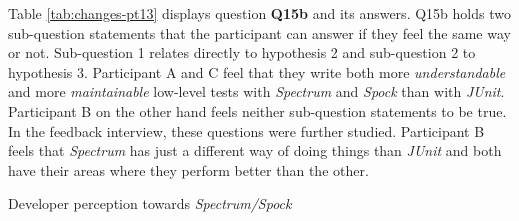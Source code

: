 Table \ref{tab:changes-pt13} displays question \textbf{Q15b} and its answers. Q15b holds two sub-question statements that the participant can answer
if they feel the same way or not. Sub-question 1 relates directly to hypothesis 2 and sub-question 2 to
hypothesis 3. Participant A and C feel that they write both more \textit{understandable} and more \textit{maintainable} low-level
tests with \textit{Spectrum} and \textit{Spock} than with \textit{JUnit}. Participant B on the other hand feels neither sub-question statements
to be true. In the feedback interview, these questions were further studied. Participant B feels that \textit{Spectrum} has just a
different way of doing things than \textit{JUnit} and both have their areas where they perform better than the other.

    \begin{table}[H]
            \caption {Developer perception towards \textit{Spectrum/Spock}} \label{tab:changes-pt13}

    \end{table}

